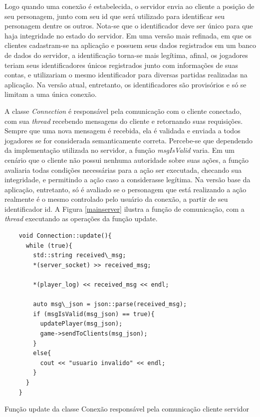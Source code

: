 Logo quando uma conexão é estabelecida, o servidor envia ao cliente a posição de seu personagem, junto com seu id que será utilizado para identificar seu personagem dentre os outros. Nota-se que o identificador deve ser único para que haja integridade no estado do servidor. Em uma versão mais refinada, em que os clientes cadastram-se na aplicação e possuem seus dados registrados em um banco de dados do servidor, a identificação torna-se mais legítima, afinal, os jogadores teriam seus identificadores únicos registrados junto com informações de suas contas, e utilizariam o mesmo identificador para diversas partidas realizadas na aplicação. Na versão atual, entretanto, os identificadores são provisórios e só se limitam a uma única conexão.

A classe \textit{Connection} é responsável pela comunicação com o cliente conectado, com sua \textit{thread} recebendo mensagens do cliente e retornando suas requisições. Sempre que uma nova mensagem é recebida, ela é validada e enviada a todos jogadores se for considerada semanticamente correta. Percebe-se que dependendo da implementação utilizada no servidor, a função \textit{msgIsValid} varia. Em um cenário que o cliente não possui nenhuma autoridade sobre suas ações, a função avaliaria todas condições necessárias para a ação ser executada, checando sua integridade, e permitindo a ação caso a considerasse legítima. Na versão base da aplicação, entretanto, só é avaliado se o personagem que está realizando a ação realmente é o mesmo controlado pelo usuário da conexão, a partir de seu identificador id. A Figura \ref{mainserver} ilustra a função de comunicação, com a \textit{thread} executando as operações da função update.


\begin{ilustracao}
    \begin{lstlisting}
    void Connection::update(){
      while (true){
        std::string received\_msg;
        *(server_socket) >> received_msg;

        *(player_log) << received_msg << endl;

        auto msg\_json = json::parse(received_msg);
        if (msgIsValid(msg_json) == true){
          updatePlayer(msg_json);
          game->sendToClients(msg_json);
        }
        else{
          cout << "usuario invalido" << endl;
        }
      }
    }
    \end{lstlisting}
    \caption{Função update da classe Conexão responsável pela comunicação cliente servidor}
    \label{mainserver}
\end{ilustracao}


